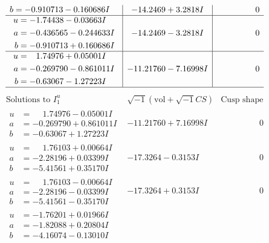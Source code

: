 \documentclass[1p]{elsarticle_modified}
\theoremstyle{definition}
\newcommand{\I}{\sqrt{-1}}
\begin{document}
$$\begin{array}{c|c|c}
\begin{aligned}
b &= -0.910713 - 0.160686 I\end{aligned}
 & -14.2469 + 3.2818 I & \phantom{-0.000000 } 0 \\ \hline\begin{aligned}
u &= -1.74438 - 0.03663 I \\
a &= -0.436565 - 0.244633 I \\
b &= -0.910713 + 0.160686 I\end{aligned}
 & -14.2469 - 3.2818 I & \phantom{-0.000000 } 0 \\ \hline\begin{aligned}
u &= \phantom{-}1.74976 + 0.05001 I \\
a &= -0.269790 - 0.861011 I \\
b &= -0.63067 - 1.27223 I\end{aligned}
 & -11.21760 - 7.16998 I & \phantom{-0.000000 } 0\\
 \hline 
 \end{array}$$\newpage$$\begin{array}{c|c|c}  
\text{Solutions to }I^u_{1}& \I (\text{vol} + \sqrt{-1}CS) & \text{Cusp shape}\\
 \hline 
\begin{aligned}
u &= \phantom{-}1.74976 - 0.05001 I \\
a &= -0.269790 + 0.861011 I \\
b &= -0.63067 + 1.27223 I\end{aligned}
 & -11.21760 + 7.16998 I & \phantom{-0.000000 } 0 \\ \hline\begin{aligned}
u &= \phantom{-}1.76103 + 0.00664 I \\
a &= -2.28196 + 0.03399 I \\
b &= -5.41561 + 0.35170 I\end{aligned}
 & -17.3264 - 0.3153 I & \phantom{-0.000000 } 0 \\ \hline\begin{aligned}
u &= \phantom{-}1.76103 - 0.00664 I \\
a &= -2.28196 - 0.03399 I \\
b &= -5.41561 - 0.35170 I\end{aligned}
 & -17.3264 + 0.3153 I & \phantom{-0.000000 } 0 \\ \hline\begin{aligned}
u &= -1.76201 + 0.01966 I \\
a &= -1.82088 + 0.20804 I \\
b &= -4.16074 - 0.13010 I\end{aligned}

\end{array}$$
\end{document}
